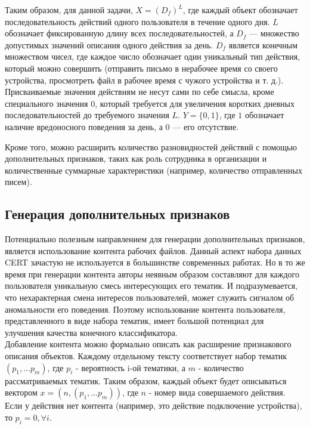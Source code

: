 Таким образом, для данной задачи, $X=(D_{f})^L$, где каждый объект обозначает последовательность действий одного пользователя в течение одного дня. $L$ обозначает фиксированную длину всех последовательностей, а $D_{f}$ --- множество допустимых значений описания одного действия за день. $D_f$ является конечным множеством чисел, где каждое число обозначает один уникальный тип действия, который можно совершить (отправить письмо в нерабочее время со своего устройства, просмотреть файл в рабочее время с чужого устройства и т. д.). Присваиваемые значения действиям не несут сами по себе смысла, кроме специального значения $0$, который требуется для увеличения коротких дневных последовательностей до требуемого значения $L$. $Y=\{0,1\}$, где $1$ обозначает наличие вредоносного поведения за день, а $0$ --- его отсутствие.

% 


Кроме того, можно расширить количество разновидностей действий с помощью дополнительных признаков, таких как роль сотрудника в организации и количественные суммарные характеристики (например, количество отправленных писем). \\

\subsection*{Генерация дополнительных признаков}

 Потенциально полезным направлением для генерации дополнительных признаков, является использование контента рабочих файлов. Данный аспект набора данных CERT зачастую не используется в большинстве современных работах. Но в то же время при генерации контента авторы неявным образом составляют для каждого пользователя уникальную смесь интересующих его тематик. И подразумевается, что нехарактерная смена интересов пользователей, может служить сигналом об аномальности его поведения. Поэтому использование контента пользователя, представленного в виде набора тематик, имеет большой потенциал для улучшения качества конечного классификатора.\\
Добавление контента можно формально описать как расширение признакового описания объектов. Каждому отдельному тексту соответствует набор тематик $(p_1, \dots p_m)$, где $p_i$ - вероятность i-ой тематики, а $m$ - количество рассматриваемых тематик. Таким образом, каждый объект будет описываться вектором $x = (n, (p_1, \dots p_m))$, где $n$ - номер вида совершаемого действия. Если у действия нет контента (например, это действие подключение устройства), то $p_i = 0, \forall i$.\\

